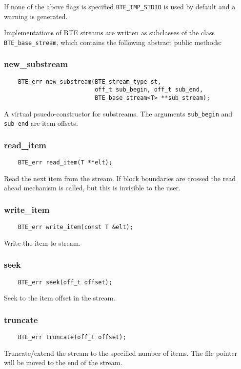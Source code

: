 If none of the above flags is specified {\tt BTE\_IMP\_STDIO} is used by
default and a warning is generated.

Implementations of BTE streams are written as subclasses of the class
\verb|BTE_base_stream|, which contains the following abstract public methods:


\subsubsection{new\_substream}
\begin{verbatim}
    BTE_err new_substream(BTE_stream_type st,
                          off_t sub_begin, off_t sub_end,
                          BTE_base_stream<T> **sub_stream);
\end{verbatim}
A virtual psuedo-constructor for substreams. The arguments \verb|sub_begin| and
\verb|sub_end| are item offsets.


\subsubsection{read\_item}
\begin{verbatim}
    BTE_err read_item(T **elt);
\end{verbatim}
Read the next item from the stream. If block boundaries are crossed the
read ahead mechanism is called, but this is invisible to the user.

\subsubsection{write\_item}
\begin{verbatim}
    BTE_err write_item(const T &elt);
\end{verbatim}
Write the item to stream.


\subsubsection{seek}
\begin{verbatim}
    BTE_err seek(off_t offset);
\end{verbatim}
Seek to the item offset in the stream.


\subsubsection{truncate}
\begin{verbatim}
    BTE_err truncate(off_t offset);
\end{verbatim}
Truncate/extend the stream to the specified number of items. The file
pointer will be moved to the end of the stream.


